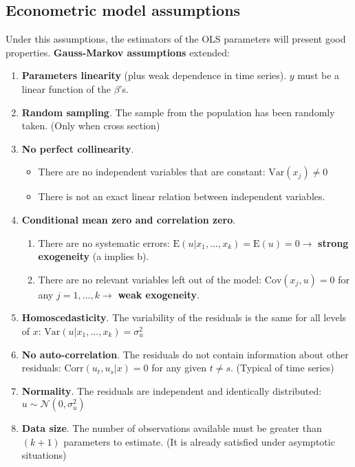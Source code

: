 \documentclass[10pt, a4paper, landscape]{extarticle}
\newcommand{\E}{\mathrm{E}}
\newcommand{\Var}{\mathrm{Var}}
\newcommand{\Cov}{\mathrm{Cov}}
\newcommand{\Corr}{\mathrm{Corr}}
\begin{document}
\begin{multicols}{3}
	\subsection*{Econometric model assumptions}
		Under this assumptions, the estimators of the OLS parameters will present good properties. \textbf{Gauss-Markov assumptions} extended:
		\begin{enumerate}[leftmargin=*]
			\item \textbf{Parameters linearity} (plus weak dependence in time series). $y$ must be a linear function of the $\beta$'s.
			\item \textbf{Random sampling}. The sample from the population has been randomly taken. (Only when cross section)
			\item \textbf{No perfect collinearity}.
			\begin{itemize}[leftmargin=*]
				\item There are no independent variables that are constant: $\Var(x_j) \neq 0$
				\item There is not an exact linear relation between independent variables.
			\end{itemize}
			\item \textbf{Conditional mean zero and correlation zero}.
			\begin{enumerate}[leftmargin=*, label=\alph*.]
				\item There are no systematic errors: $\E(u | x_1, ..., x_k) = \E(u) = 0 \rightarrow$ \textbf{strong exogeneity} (a implies b).
				\item There are no relevant variables left out of the model: $\Cov(x_j , u) = 0$ for any $j = 1, ..., k \rightarrow$ \textbf{weak exogeneity}.
			\end{enumerate}
			\item \textbf{Homoscedasticity}. The variability of the residuals is the same for all levels of $x$: $\Var(u | x_1, ..., x_k) = \sigma^2_u$
			\item \textbf{No auto-correlation}. The residuals do not contain information about other residuals: $\Corr(u_t, u_s | x) = 0$ for any given $t \neq s$. (Typical of time series)
			\item \textbf{Normality}. The residuals are independent and identically distributed: $u \sim \mathcal{N}(0,\sigma^2_u)$
			\item \textbf{Data size}. The number of observations available must be greater than $(k + 1)$ parameters to estimate. (It is already satisfied under asymptotic situations)		
		\end{enumerate}		

\end{multicols}
\end{document}
